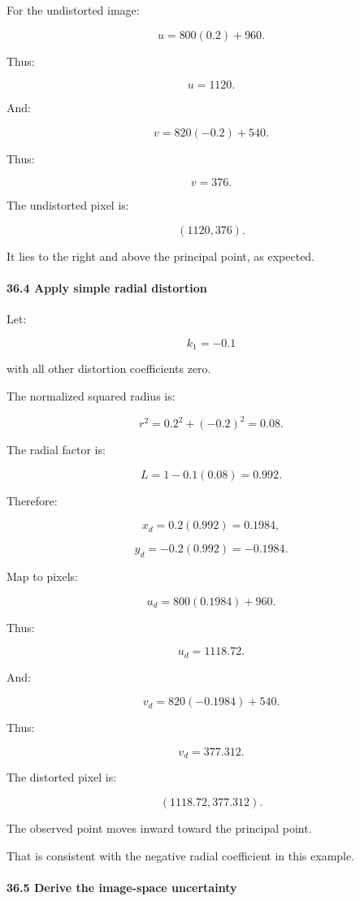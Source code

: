 For the undistorted image:

\[
 u=800(0.2)+960.
\]

Thus:

\[
 \boxed{u=1120}.
\]

And:

\[
 v=820(-0.2)+540.
\]

Thus:

\[
 \boxed{v=376}.
\]

The undistorted pixel is:

\[
 \boxed{(1120,376)}.
\]

It lies to the right and above the principal point, as expected.

\paragraph{36.4 Apply simple radial distortion}\label{apply-simple-radial-distortion}

Let:

\[
 k_1=-0.1
\]

with all other distortion coefficients zero.

The normalized squared radius is:

\[
 r^2=0.2^2+(-0.2)^2=0.08.
\]

The radial factor is:

\[
 L=1-0.1(0.08)=0.992.
\]

Therefore:

\[
 x_d=0.2(0.992)=0.1984,
\]

\[
 y_d=-0.2(0.992)=-0.1984.
\]

Map to pixels:

\[
 u_d=800(0.1984)+960.
\]

Thus:

\[
 \boxed{u_d=1118.72}.
\]

And:

\[
 v_d=820(-0.1984)+540.
\]

Thus:

\[
 \boxed{v_d=377.312}.
\]

The distorted pixel is:

\[
 \boxed{(1118.72,377.312)}.
\]

The observed point moves inward toward the principal point.

That is consistent with the negative radial coefficient in this example.

\paragraph{36.5 Derive the image-space uncertainty}\label{derive-the-image-space-uncertainty}

